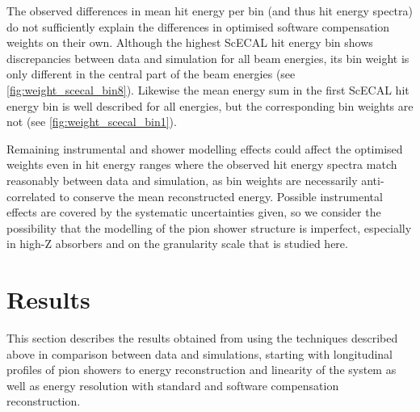 \documentclass[twoside,a4paper,12pt]{article}
\begin{document}
The observed differences in mean hit energy per bin (and thus hit energy spectra) do not sufficiently explain the differences in optimised software compensation weights on their own. Although the highest ScECAL hit energy bin shows discrepancies between data and simulation for all beam energies, its bin weight is only different in the central part of the beam energies (see \autoref{fig:weight_scecal_bin8}). Likewise the mean energy sum in the first ScECAL hit energy bin is well described for all energies, but the corresponding bin weights are not (see \autoref{fig:weight_scecal_bin1}).

Remaining instrumental and shower modelling effects could affect the optimised weights even in hit energy ranges where the observed hit energy spectra match reasonably between data and simulation, as bin weights are necessarily anti-correlated to conserve the mean reconstructed energy. Possible instrumental effects are covered by the systematic uncertainties given, so we consider the possibility that the modelling of the pion shower structure is imperfect, especially in high-Z absorbers and on the granularity scale that is studied here.
\section{Results}
This section describes the results obtained from using the techniques described above in comparison between data and simulations, starting with longitudinal profiles of pion showers to energy reconstruction and linearity of the system as well as energy resolution with standard and software compensation reconstruction.
\end{document}
